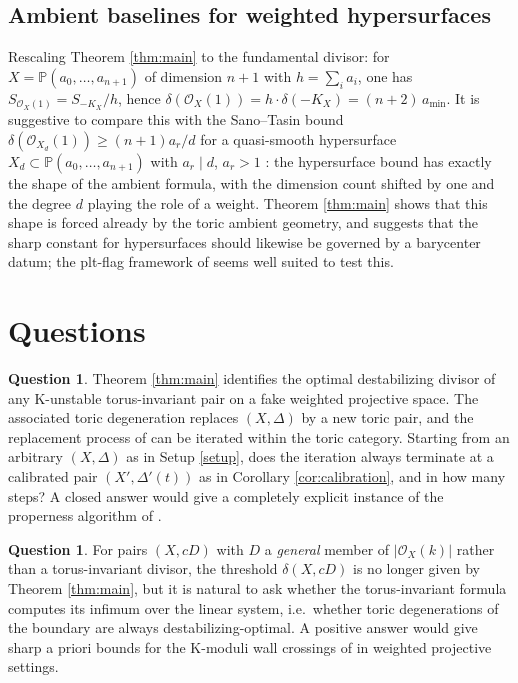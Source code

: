\documentclass[11pt]{amsart}
\theoremstyle{definition}
\newtheorem{question}[theorem]{Question}
\theoremstyle{remark}
\newcommand{\PP}{\mathbb{P}}
\begin{document}
\subsection{Ambient baselines for weighted hypersurfaces}
\label{ss:ambient}
Rescaling Theorem \ref{thm:main} to the fundamental divisor: for
\(X=\PP(a_0,\dots,a_{n+1})\) of dimension \(n+1\) with
\(h=\sum_ia_i\), one has \(S_{\mathcal O_X(1)}=S_{-K_X}/h\), hence
\(\delta(\mathcal O_X(1))=h\cdot\delta(-K_X)=(n+2)\,a_{\min}\).
It is suggestive to compare this
with the Sano--Tasin bound
\(\delta(\mathcal O_{X_d}(1))\ge(n+1)a_r/d\) for a quasi-smooth
hypersurface \(X_d\subset\PP(a_0,\dots,a_{n+1})\) with \(a_r\mid d\),
\(a_r>1\) \cite{ST24}: the hypersurface bound has exactly the shape of
the ambient formula, with the dimension count shifted by one and the
degree \(d\) playing the role of a weight. Theorem \ref{thm:main} shows
that this shape is forced already by the toric ambient geometry, and
suggests that the sharp constant for hypersurfaces should likewise be
governed by a barycenter datum; the plt-flag framework of \cite{CFST26}
seems well suited to test this.

\section{Questions}\label{sec:questions}

\begin{question}
Theorem \ref{thm:main} identifies the optimal destabilizing divisor of
any K-unstable torus-invariant pair on a fake weighted projective space.
The associated toric degeneration replaces \((X,\Delta)\) by a new toric
pair, and the replacement process of \cite{BLXZ25} can be iterated within
the toric category. Starting from an arbitrary \((X,\Delta)\) as in Setup
\ref{setup}, does the iteration always terminate at a calibrated pair
\((X',\Delta'(t))\) as in Corollary \ref{cor:calibration}, and in how
many steps? A closed answer would give a completely explicit instance of
the properness algorithm of \cite{BLXZ25}.
\end{question}

\begin{question}
For pairs \((X, cD)\) with \(D\) a \emph{general} member of
\(|\mathcal O_X(k)|\) rather than a torus-invariant divisor, the
threshold \(\delta(X,cD)\) is no longer given by Theorem \ref{thm:main},
but it is natural to ask whether the torus-invariant formula computes its
infimum over the linear system, i.e.\ whether toric degenerations of the
boundary are always destabilizing-optimal. A positive answer would give
sharp a priori bounds for the K-moduli wall crossings of
\cite{ADL24,KLW24} in weighted projective settings.
\end{question}
\end{document}
